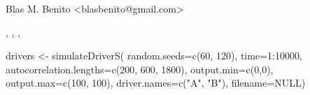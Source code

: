 \documentclass[letterpaper]{book}
\begin{document}
%
\begin{Author}\relax
Blas M. Benito  <blasbenito@gmail.com>
\end{Author}
%
\begin{SeeAlso}\relax
{}, , , 
\end{SeeAlso}
%
\begin{Examples}
\begin{ExampleCode}

drivers <- simulateDriverS(
 random.seeds=c(60, 120),
 time=1:10000,
 autocorrelation.lengths=c(200, 600, 1800),
 output.min=c(0,0),
 output.max=c(100, 100),
 driver.names=c("A", "B"),
 filename=NULL)

\end{ExampleCode}
\end{Examples}
%
\end{document}
